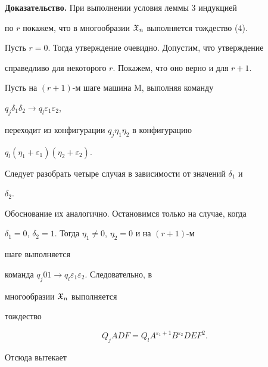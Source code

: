  


{\bf Доказательство.} При выполнении условия леммы 3 индукцией  


по $r$ покажем, что в многообразии $\frak X_n$ выполняется тождество (4). 


 


Пусть $r=0$. Тогда утверждение очевидно. Допустим, что утверждение  


справедливо для некоторого $r$. Покажем, что оно верно и для $r+1$. 


Пусть на $(r+1)$-м шаге машина M, выполняя команду 


$q_j\delta_1\delta_2\to q_l\varepsilon_1\varepsilon_2$, 


переходит из конфигурации $q_j\eta_1\eta_2$ в конфигурацию 


$q_l(\eta_1+\varepsilon_1)(\eta_2+\varepsilon_2)$. 


Следует разобрать четыре случая в зависимости от значений $\delta_1$ и 


$\delta_2$. 


Обоснование их аналогично. Остановимся только на случае, когда 


$\delta_1=0$, $\delta_2=1$. Тогда $\eta_1\ne0$, $\eta_2=0$ и на $(r+1)$-м 


шаге выполняется  


команда $q_j01\to q_l\varepsilon_1\varepsilon_2$. Следовательно, в 


многообразии $\frak X_n$ выполняется  


тождество 


$$ 


Q_j A D F=Q_l A^{\varepsilon_1+1}B^{\varepsilon_2}D E F^2. 


$$ 


Отсюда вытекает 


